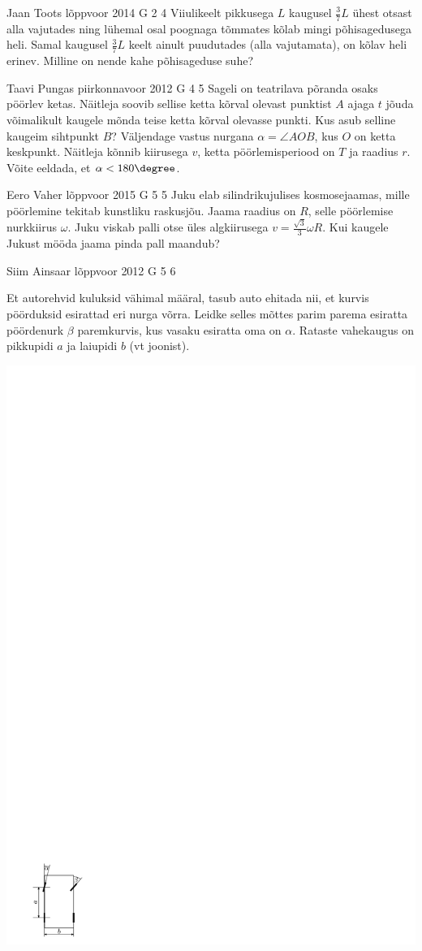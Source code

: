\documentclass[11pt]{article}
\begin{document}
{%
{Jaan Toots} %
{lõppvoor} %
{2014} %
{G 2} %
{4} %
{
\ifStatement
Viiulikeelt pikkusega $L$ kaugusel $\frac{3}{7}L$ ühest otsast alla vajutades ning lühemal osal poognaga tõmmates kõlab mingi põhisagedusega heli. Samal kaugusel $\frac{3}{7}L$ keelt ainult puudutades (alla vajutamata), on kõlav heli erinev. Milline on nende kahe põhisageduse suhe?
\fi
}

{Taavi Pungas} %
{piirkonnavoor} %
{2012} %
{G 4} %
{5} %
{
\ifStatement
Sageli on teatrilava põranda osaks pöörlev ketas. Näitleja soovib sellise ketta
kõrval olevast punktist $A$ ajaga $t$ jõuda võimalikult kaugele mõnda teise ketta
kõrval olevasse punkti. Kus asub selline kaugeim sihtpunkt $B$? Väljendage vastus nurgana
$\alpha = \angle \mathit{AOB}$, kus $O$ on ketta keskpunkt. Näitleja kõnnib
kiirusega $v$, ketta pöörlemisperiood on $T$ ja raadius $r$. Võite eeldada, et $\alpha < 180\degree$.
\fi
}

{Eero Vaher} %
{lõppvoor} %
{2015} %
{G 5} %
{5} %
{
\ifStatement
Juku elab silindrikujulises kosmosejaamas, mille pöörlemine tekitab kunstliku raskusjõu. Jaama raadius on $R$, selle pöörlemise nurkkiirus $\omega$. Juku viskab palli otse üles algkiirusega $v=\frac{\sqrt{3}}{3}\omega R$. Kui kaugele Jukust mööda jaama pinda pall maandub?
\fi
}

{Siim Ainsaar} %
{lõppvoor} %
{2012} %
{G 5} %
{6} %
{
\ifStatement
Et autorehvid kuluksid vähimal määral, tasub auto ehitada nii, et kurvis
pöörduksid esirattad eri nurga võrra. Leidke selles mõttes parim parema
esiratta pöördenurk $\beta$ paremkurvis, kus
vasaku esiratta oma on $\alpha$. Rataste vahekaugus on pikkupidi $a$ ja laiupidi
$b$ (vt joonist).
\begin{center}
\includegraphics[width=0.3\linewidth]{2012-v3g-05-r_yl_joonis}%
\end{center}
\fi
}

}
\end{document}
